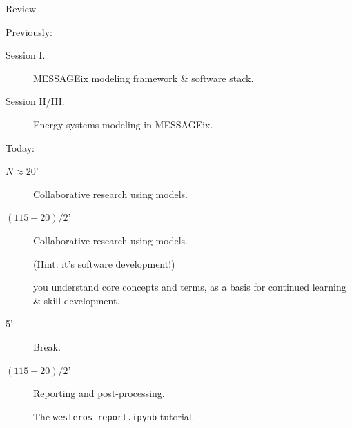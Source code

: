 \documentclass[12pt,aspectratio=169]{beamer}
\begin{document}
\maketitle

\begin{frame}{Review}

Previously:
\begin{description}
  \item [Session I.] MESSAGEix modeling framework \& software stack.
  \item [Session II/III.] Energy systems modeling in MESSAGEix.
\end{description}

\bigskip
Today:
\begin{description}
  \item [$N \approx 20$'] Collaborative research using models.


  \item [$(115 - 20) / 2$'] Collaborative research using models.

  (Hint: it's software development!)

   you understand core concepts and terms, as a basis for continued learning \& skill development.

  \item [5'] Break.

  \item [$(115 - 20) / 2$'] Reporting and post-processing.

  The \texttt{westeros\_report.ipynb} tutorial.
\end{description}

\end{frame}
\end{document}
